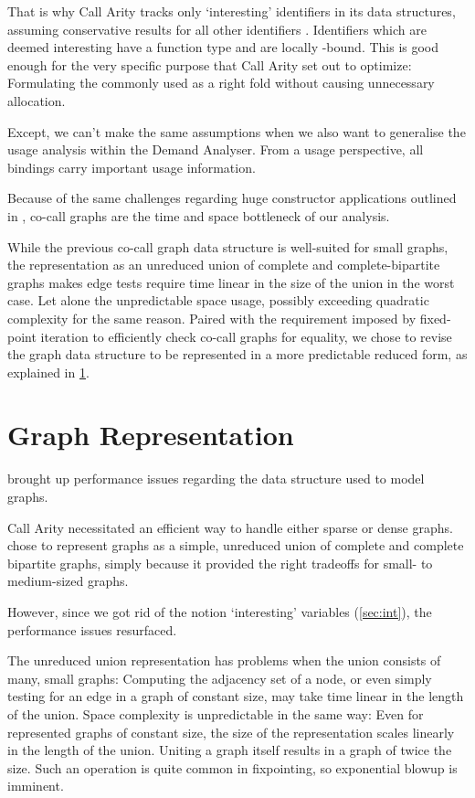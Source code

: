 That is why Call Arity tracks only `interesting' identifiers in its data structures, assuming conservative results for all other identifiers \parencite{callarity}. 
Identifiers which are deemed interesting have a function type and are locally -bound.
This is good enough for the very specific purpose that Call Arity set out to optimize: 
Formulating the commonly used  as a right fold without causing unnecessary allocation.

Except, we can't make the same assumptions when we also want to generalise the usage analysis within the Demand Analyser.
From a usage perspective, all bindings carry important usage information. 

Because of the same challenges regarding huge constructor applications outlined in \textcite[Section~3.4.1]{callarity}, co-call graphs are the time and space bottleneck of our analysis.

While the previous co-call graph data structure is well-suited for small graphs, the representation as an unreduced union of complete and complete-bipartite graphs makes edge tests require time linear in the size of the union in the worst case. 
Let alone the unpredictable space usage, possibly exceeding quadratic complexity for the same reason.
Paired with the requirement imposed by fixed-point iteration to efficiently check co-call graphs for equality, we chose to revise the graph data structure to be represented in a more predictable reduced form, as explained in \cref{sec:graphrep}.

\section{Graph Representation}\label{sec:graphrep}

 brought up performance issues regarding the data structure used to model graphs.

Call Arity necessitated an efficient way to handle either sparse or dense graphs.
\textcite{callarity} chose to represent graphs as a simple, unreduced union of complete and complete bipartite graphs, simply because it provided the right tradeoffs for small- to medium-sized graphs.

However, since we got rid of the notion `interesting' variables (\cf \cref{sec:int}), the performance issues resurfaced.

The unreduced union representation has problems when the union consists of many, small graphs:
Computing the adjacency set of a node, or even simply testing for an edge in a graph of constant size, may take time linear in the length of the union.
Space complexity is unpredictable in the same way:
Even for represented graphs of constant size, the size of the representation scales linearly in the length of the union.
Uniting a graph itself results in a graph of twice the size.
Such an operation is quite common in fixpointing, so exponential blowup is imminent.

